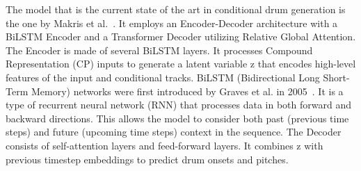 The model that is the current state of the art in conditional drum generation is the one by Makris et al.~\cite{makris_conditional_2022}.
It employs an Encoder-Decoder architecture with a BiLSTM Encoder and a Transformer Decoder utilizing Relative Global Attention.
The Encoder is made of several BiLSTM layers.
It processes Compound Representation (CP) inputs to generate a latent variable z that encodes high-level features of the input and conditional tracks.
BiLSTM (Bidirectional Long Short-Term Memory) networks were first introduced by Graves et al. in 2005~\cite{graves_framewise_2005}.
It is a type of recurrent neural network (RNN) that processes data in both forward and backward directions.
This allows the model to consider both past (previous time steps) and future (upcoming time steps) context in the sequence.
The Decoder consists of self-attention layers and feed-forward layers. 
It combines z with previous timestep embeddings to predict drum onsets and pitches.


